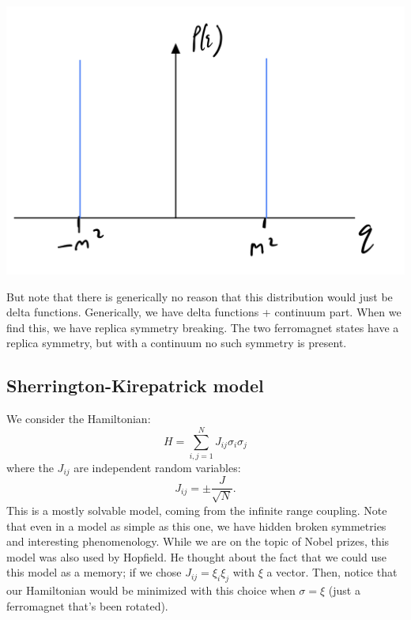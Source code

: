 \begin{center}
    \includegraphics[scale=0.3]{Lectures/Figures/lec14-fmdist.png}
\end{center}

But note that there is generically no reason that this distribution would just be delta functions. Generically, we have delta functions + continuum part. When we find this, we have replica symmetry breaking. The two ferromagnet states have a replica symmetry, but with a continuum no such symmetry is present.

\subsection{Sherrington-Kirepatrick model}
We consider the Hamiltonian:
\begin{equation}
    H = \sum_{i,j=1}^N J_{ij}\sigma_i\sigma_j
\end{equation}
where the $J_{ij}$ are independent random variables:
\begin{equation}
    J_{ij} = \pm \frac{J}{\sqrt{N}}.
\end{equation}
This is a mostly solvable model, coming from the infinite range coupling. Note that even in a model as simple as this one, we have hidden broken symmetries and interesting phenomenology. While we are on the topic of Nobel prizes, this model was also used by Hopfield. He thought about the fact that we could use this model as a memory; if we chose $J_{ij} = \xi_i\xi_j$ with $\xi$ a vector. Then, notice that our Hamiltonian would be minimized with this choice when $\sigma = \xi$ (just a ferromagnet that's been rotated).

